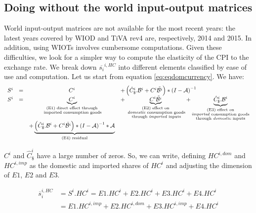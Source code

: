 \documentclass[11pt,a4paper]{article}
\begin{document}
\subsection{Doing without the world input-output matrices}
World input-output matrices are not available for the most recent years: the latest years covered by WIOD and TiVA rev4 are, respectively, 2014 and 2015. 
In addition, using WIOTs involves cumbersome computations.
Given these difficulties, we look for a simpler way to compute the elasticity of the CPI to the exchange rate.
We break down $\overline{s_{i}}^{i,HC}$ into different elements classified by ease of use and computation.
Let us start from equation \ref{eq:eqdomcurrency}.
We have:
\begin{equation}
\begin{array}{lccl}
	S^ i&=&C^i	&+ \left(\hat{C}^i_\$.{\cal B}^i+{C^i}{\tilde{{\cal B}^i}}\right)*{{(I-{\cal A})}^{-1}} \\
	S^i &=&\underbrace{C^i}_{\substack{\text{(E1) direct effect through} \\ \text{ imported consumption goods}}}&+ \underbrace{{C^i}{\tilde{{\cal B}^i}}}_{\substack{\text{(E2) effect on} \\ \text{ \emph{domestic} consumption goods} \\ \text{ through \emph{imported} inputs}}}  + \underbrace{\hat{C}^i_\$.{\cal B}^i}_{\substack{\text{(E3)  effect on} \\ \text{\emph{imported} consumption goods} \\ \text{through \emph{domestic} inputs}}} \\ &&+\underbrace {\left( \hat{C}^i_\$.{\cal B}^i + {C^i}{\tilde{{\cal B}^i}}\right)*{{(I-{\cal A})}^{-1}}*{\cal A}}_{\text{(E4) residual}} \\
\end{array}
\label{eq:decomp}
\end{equation}


$C^i$ and $\hat{C}^i_\$$ have a large number of zeros. So, we can write, defining $HC^{i,dom}$ and $HC^{i,imp}$ as the domestic and imported shares of $HC^i$ and adjusting the dimension of $E1$, $E2$ and $E3$.

\begin{equation}
\begin{array}{lccl}
\overline{s}_{i}^{i,HC}&=S^i.HC^i=E1.HC^i+E2.HC^i+E3.HC^i+E4.HC^i \\
&=E1.HC^{i,imp}+E2.HC^{i,dom}+E3.HC^{i,imp}+E4.HC^i
 \end{array} 
 \label{eq:eqtoto}
 \end{equation}
 
\end{document}
